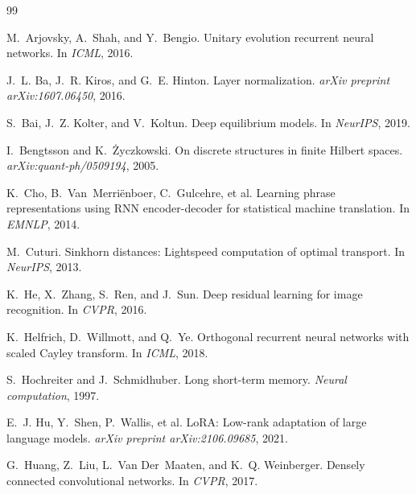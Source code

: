 \documentclass[11pt,a4paper]{article}
\begin{document}

\begin{thebibliography}{99}

M.~Arjovsky, A.~Shah, and Y.~Bengio.
\newblock Unitary evolution recurrent neural networks.
\newblock In \emph{ICML}, 2016.

J.~L. Ba, J.~R. Kiros, and G.~E. Hinton.
\newblock Layer normalization.
\newblock \emph{arXiv preprint arXiv:1607.06450}, 2016.

S.~Bai, J.~Z. Kolter, and V.~Koltun.
\newblock Deep equilibrium models.
\newblock In \emph{NeurIPS}, 2019.

I.~Bengtsson and K.~{\.Z}yczkowski.
\newblock On discrete structures in finite Hilbert spaces.
\newblock \emph{arXiv:quant-ph/0509194}, 2005.

K.~Cho, B.~Van~Merri{\"e}nboer, C.~Gulcehre, et al.
\newblock Learning phrase representations using RNN encoder-decoder for statistical machine translation.
\newblock In \emph{EMNLP}, 2014.

M.~Cuturi.
\newblock Sinkhorn distances: Lightspeed computation of optimal transport.
\newblock In \emph{NeurIPS}, 2013.

K.~He, X.~Zhang, S.~Ren, and J.~Sun.
\newblock Deep residual learning for image recognition.
\newblock In \emph{CVPR}, 2016.

K.~Helfrich, D.~Willmott, and Q.~Ye.
\newblock Orthogonal recurrent neural networks with scaled Cayley transform.
\newblock In \emph{ICML}, 2018.

S.~Hochreiter and J.~Schmidhuber.
\newblock Long short-term memory.
\newblock \emph{Neural computation}, 1997.

E.~J. Hu, Y.~Shen, P.~Wallis, et al.
\newblock LoRA: Low-rank adaptation of large language models.
\newblock \emph{arXiv preprint arXiv:2106.09685}, 2021.

G.~Huang, Z.~Liu, L.~Van Der~Maaten, and K.~Q. Weinberger.
\newblock Densely connected convolutional networks.
\newblock In \emph{CVPR}, 2017.


\end{thebibliography}
\end{document}
